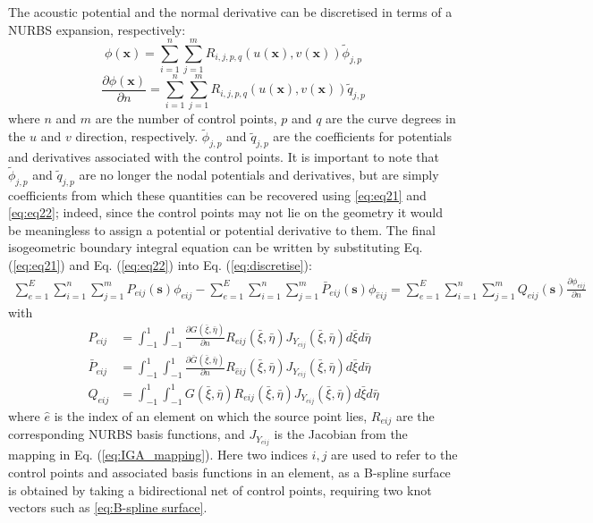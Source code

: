 \documentclass[review]{elsarticle}
\begin{document}
The acoustic potential and the normal derivative can be discretised in terms of a NURBS expansion, respectively:
\begin{equation}
\phi(\mathbf{x})=\sum_{i=1}^{n}\sum_{j=1}^{m}R_{i,j,p,q}(u(\mathbf{x}),v(\mathbf{x}))\widetilde{\phi}_{j,p}
\label{eq:eq21}
\end{equation}
\begin{equation}
\frac{\partial\phi(\mathbf{x})}{\partial n}=\sum_{i=1}^{n}\sum_{j=1}^{m}R_{i,j,p,q}(u(\mathbf{x}),v(\mathbf{x}))\widetilde{q}_{j,p}
\label{eq:eq22}
\end{equation}
where $n$ and $m$ are the number of control points, $p$ and $q$ are the curve degrees in the $u$ and $v$ direction, respectively. $\widetilde{\phi}_{j,p}$ and $\widetilde{q}_{j,p}$ are the coefficients for potentials and derivatives associated with the control points. It is important to note that $\widetilde{\phi}_{j,p}$ and $\widetilde{q}_{j,p}$ are no longer the nodal potentials and derivatives, but are simply coefficients from which these quantities can be recovered using \eqref{eq:eq21} and \eqref{eq:eq22}; indeed, since the control points may not lie on the geometry it would be meaningless to assign a potential or potential derivative to them. The final isogeometric boundary integral equation can be written by substituting Eq. (\ref{eq:eq21}) and Eq. (\ref{eq:eq22}) into Eq. (\ref{eq:discretise}):
\begin{equation}
\begin{split}
\sum_{e=1}^{E}\sum_{i=1}^{n}\sum_{j=1}^{m}  P_{eij}(\mathbf{s})\phi_{eij} -\sum_{e=1}^{E}\sum_{i=1}^{n}\sum_{j=1}^{m}  \bar{P}_{eij}(\mathbf{s})\phi_{\hat{e}ij} = \sum_{e=1}^{E}\sum_{i=1}^{n}\sum_{j=1}^{m} Q_{eij}(\mathbf{s})\frac{\partial\phi_{eij}}{\partial n}
\end{split}
\label{eq:eq23}
\end{equation}
with 
\begin{align}
P_{eij} &= \int_{-1}^1\int_{-1}^1 \frac{\partial{G(\bar{\xi},\bar{\eta})}}{\partial n} R_{eij}(\bar{\xi},\bar{\eta}) J_{Y_{eij}}(\bar{\xi},\bar{\eta}) d\bar{\xi} d\bar{\eta}  \\
\bar{P}_{eij} &= \int_{-1}^1\int_{-1}^1 \frac{\partial{\bar{G}(\bar{\xi},\bar{\eta})}}{\partial n} R_{\hat{e}ij}(\bar{\xi},\bar{\eta}) J_{Y_{eij}}(\bar{\xi},\bar{\eta}) d\bar{\xi} d\bar{\eta}  \\
Q_{eij} &= \int_{-1}^1\int_{-1}^1 G(\bar{\xi},\bar{\eta}) R_{eij}(\bar{\xi},\bar{\eta}) J_{Y_{eij}}(\bar{\xi},\bar{\eta}) d\bar{\xi} d\bar{\eta} 
\end{align}
where $\hat{e}$ is the index of an element on which the source point lies, $R_{eij}$ are the corresponding NURBS basis functions, and $J_{Y_{eij}}$ is the Jacobian from the mapping in Eq. (\ref{eq:IGA_mapping}). Here two indices $i,j$ are used to refer to the control points and associated basis functions in an element, as a B-spline surface is obtained by taking a bidirectional net of control points, requiring two knot vectors such as \eqref{eq:B-spline surface}.
\end{document}
